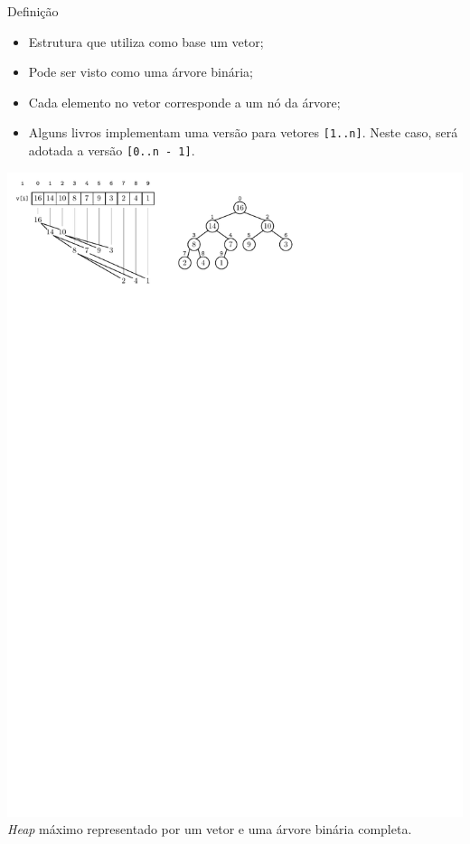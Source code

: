 \documentclass[t, 10pt]{beamer}
\begin{document}
  \begin{frame}{Definição}
    \begin{itemize}
      \item Estrutura que utiliza como base um vetor;
      \item Pode ser visto como uma árvore binária;
      \item Cada elemento no vetor corresponde a um nó da árvore;
      \item Alguns livros implementam uma versão para vetores \texttt{[1..n]}.
      Neste caso, será adotada a versão \texttt{[0..n - 1]}.
    \end{itemize}

    \pause
    \begin{center}
      \includegraphics[width=\textwidth]{img/img31.pdf}
      {\footnotesize
        \emph{Heap} máximo representado por um vetor e uma árvore 
        binária completa. 
      } 
    \end{center}
  \end{frame}
\end{document}
